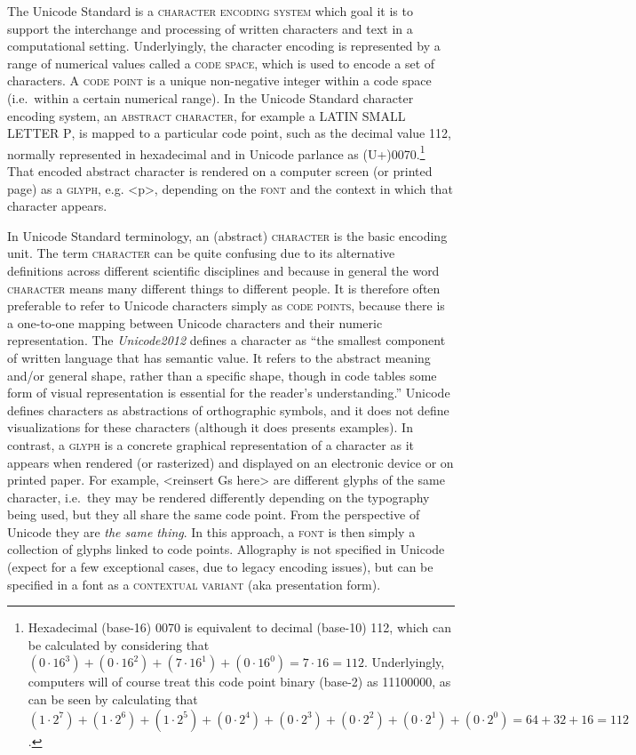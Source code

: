 The Unicode Standard is a \textsc{character encoding system} which goal it is to
support the interchange and processing of written characters and text in a
computational setting. Underlyingly, the character encoding is represented by a
range of numerical values called a \textsc{code space}, which is used to encode
a set of characters. A \textsc{code point} is a unique non-negative integer
within a code space (i.e.~within a certain numerical range). In the Unicode
Standard character encoding system, an \textsc{abstract character}, for example
a \textsc{LATIN SMALL LETTER P}, is mapped to a particular code point, such as
the decimal value 112, normally represented in hexadecimal and in Unicode
parlance as (U+)0070.\footnote{Hexadecimal (base-16) 0070 is equivalent to
decimal (base-10) 112, which can be calculated by considering that $(0\cdot16^3)
+ (0\cdot16^2) + (7\cdot16^1) + (0\cdot16^0) = 7\cdot16 = 112$. Underlyingly,
computers will of course treat this code point binary (base-2) as 11100000, as
can be seen by calculating that $(1\cdot2^7) + (1\cdot2^6) + (1\cdot2^5) +
(0\cdot2^4) + (0\cdot2^3) + (0\cdot2^2) + (0\cdot2^1) + (0\cdot2^0) = 64 + 32 +
16 = 112$.} That encoded abstract character is rendered on a computer screen (or
printed page) as a \textsc{glyph}, e.g. <p>, depending on the \textsc{font} and
the context in which that character appears.

In Unicode Standard terminology, an (abstract) \textsc{character} is the basic
encoding unit. The term \textsc{character} can be quite confusing due to its
alternative definitions across different scientific disciplines and because in
general the word \textsc{character} means many different things to different
people. It is therefore often preferable to refer to Unicode characters simply
as \textsc{code points}, because there is a one-to-one mapping between Unicode
characters and their numeric representation. The \textit{Unicode2012} defines a
character as ``the smallest component of written language that has semantic
value. It refers to the abstract meaning and/or general shape, rather than a
specific shape, though in code tables some form of visual representation is
essential for the reader's understanding.'' Unicode defines characters as
abstractions of orthographic symbols, and it does not define visualizations for
these characters (although it does presents examples). In contrast, a
\textsc{glyph} is a concrete graphical representation of a character as it
appears when rendered (or rasterized) and displayed on an electronic device or
on printed paper. For example, <reinsert Gs here> are different glyphs of the
same character, i.e.~they may be rendered differently depending on the
typography being used, but they all share the same code point. From the
perspective of Unicode they are \textit{the same thing}. In this approach, a
\textsc{font} is then simply a collection of glyphs linked to code points.
Allography is not specified in Unicode (expect for a few exceptional cases, due
to legacy encoding issues), but can be specified in a font as a
\textsc{contextual variant} (aka presentation form).

